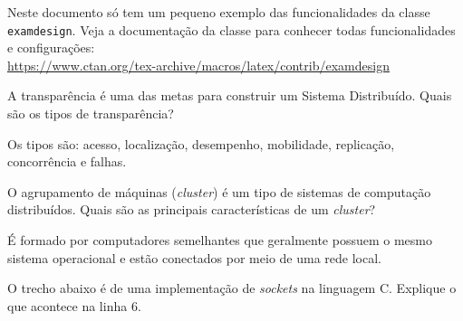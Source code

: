 \documentclass[11pt]{examdesign}
\begin{document}
\begin{exampreface}

\begin{nota}
Neste documento só tem um pequeno exemplo das funcionalidades da classe \texttt{examdesign}. Veja a documentação da classe para conhecer todas funcionalidades e configurações: \\\url{https://www.ctan.org/tex-archive/macros/latex/contrib/examdesign}
\end{nota}

\end{exampreface}



\begin{shortanswer}[title={Questões discursivas},rearrange=no,resetcounter=no]

\begin{question}
A transparência é uma das metas para construir um Sistema Distribuído. Quais são os tipos de transparência?

	\begin{answer}
	Os tipos são: acesso, localização, desempenho, mobilidade, replicação, concorrência e falhas.
	\end{answer}
\end{question}

\begin{question}
O agrupamento de máquinas (\textit{cluster}) é um tipo de sistemas de computação distribuídos. Quais são as principais características de um \textit{cluster}?

	\begin{answer}
	É formado por computadores semelhantes que geralmente possuem o mesmo sistema operacional e estão conectados por meio de uma rede local.
	\end{answer}
\end{question}

\begin{question}
O trecho abaixo é de uma implementação de \textit{sockets} na linguagem C. Explique o que acontece na linha 6.
%
%
\end{question}

\end{shortanswer}
\end{document}
